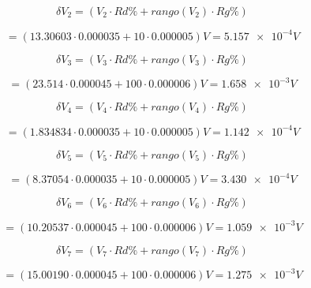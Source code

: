 \documentclass[DIV=calc, paper=a4, fontsize=11pt]{scrartcl}
\begin{document}
\begin{multicols}{2}
\begin{equation*}
    \delta V_2 = (V_2 \cdot Rd\% + rango(V_2) \cdot Rg\%) 
\end{equation*}

\begin{equation*}
    = (13.30603 \cdot 0.000035 + 10 \cdot 0.000005 ) V = \num{5.157e-4} V
\end{equation*}

\begin{equation*}
    \delta V_3 = (V_3 \cdot Rd\% + rango(V_3) \cdot Rg\%) 
\end{equation*}

\begin{equation*}
    = (23.514 \cdot 0.000045 + 100 \cdot 0.000006 ) V = \num{1.658e-3} V
\end{equation*}

\begin{equation*}
    \delta V_4 = (V_4 \cdot Rd\% + rango(V_4) \cdot Rg\%) 
\end{equation*}

\begin{equation*}
    = (1.834834 \cdot 0.000035 + 10 \cdot 0.000005 ) V = \num{1.142 e-4} V
\end{equation*}

\begin{equation*}
    \delta V_5 = (V_5 \cdot Rd\% + rango(V_5) \cdot Rg\%) 
\end{equation*}

\begin{equation*}
    = (8.37054 \cdot 0.000035 + 10 \cdot 0.000005 ) V = \num{3.430e-4} V
\end{equation*}

\begin{equation*}
    \delta V_6 = (V_6 \cdot Rd\% + rango(V_6) \cdot Rg\%) 
\end{equation*}

\begin{equation*}
    = (10.20537 \cdot 0.000045 + 100 \cdot 0.000006 ) V = \num{1.059e-3} V
\end{equation*}

\begin{equation*}
    \delta V_7 = (V_7 \cdot Rd\% + rango(V_7) \cdot Rg\%) 
\end{equation*}

\begin{equation*}
    = (15.00190 \cdot 0.000045 + 100 \cdot 0.000006 ) V = \num{1.275e-3} V
\end{equation*}


\end{multicols}
\end{document}
